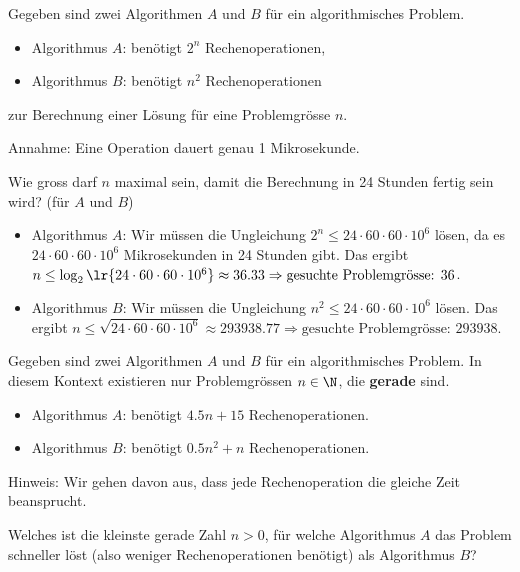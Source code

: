 \begin{frame}
\begin{myexercise}
Gegeben sind zwei Algorithmen \(A\) und \(B\) für ein algorithmisches Problem.
\begin{itemize}
	\item Algorithmus \(A\): benötigt \(2^n\) Rechenoperationen,
	\item Algorithmus \(B\): benötigt \(n^2\) Rechenoperationen
\end{itemize}
zur Berechnung einer Lösung für eine Problemgrösse \(n\).
\vspace{0.3cm}

Annahme: Eine Operation dauert genau 1 Mikrosekunde.
\vspace{0.5cm}

Wie gross darf $n$ maximal sein, damit die Berechnung in 24 Stunden fertig sein wird? (für $A$ und $B$)
\end{myexercise}
\end{frame}

\begin{frame}
\begin{myanswer}
\begin{itemize}[<+->]
	\item Algorithmus \(A\): Wir müssen die Ungleichung \(2^n \leq 24 \cdot 60 \cdot 60 \cdot 10^6\) lösen, da es $24 \cdot 60 \cdot 60 \cdot 10^6$ Mikrosekunden in 24 Stunden gibt. Das ergibt \(n \leq \log_2\lr{24 \cdot 60 \cdot 60 \cdot 10^6} \approx 36.33\Rightarrow \text{gesuchte Problemgrösse: } 36 \).
	\item Algorithmus \(B\): Wir müssen die Ungleichung \(n^2 \leq 24 \cdot 60 \cdot 60 \cdot 10^6\) lösen. Das ergibt \(n \leq \sqrt{24 \cdot 60 \cdot 60 \cdot 10^6} \approx 293938.77 \Rightarrow \text{gesuchte Problemgrösse: } 293938\).
\end{itemize}
\end{myanswer}
\end{frame}

\begin{frame}
\begin{myexercise}
Gegeben sind zwei Algorithmen \(A\) und \(B\) für ein algorithmisches Problem. In diesem Kontext existieren nur Problemgrössen \(n \in \N\), die \textbf{gerade} sind.
\begin{itemize}
	\item Algorithmus \(A\): benötigt \(4.5n + 15\) Rechenoperationen.
	\item Algorithmus \(B\): benötigt \(0.5n^2 + n\) Rechenoperationen.
\end{itemize}
Hinweis: Wir gehen davon aus, dass jede Rechenoperation die gleiche Zeit beansprucht.\\
\vspace{0.5cm}

Welches ist die kleinste gerade Zahl \(n > 0\), für welche Algorithmus \(A\) das Problem schneller löst (also weniger Rechenoperationen benötigt) als Algorithmus \(B\)?
\end{myexercise}
\end{frame}

